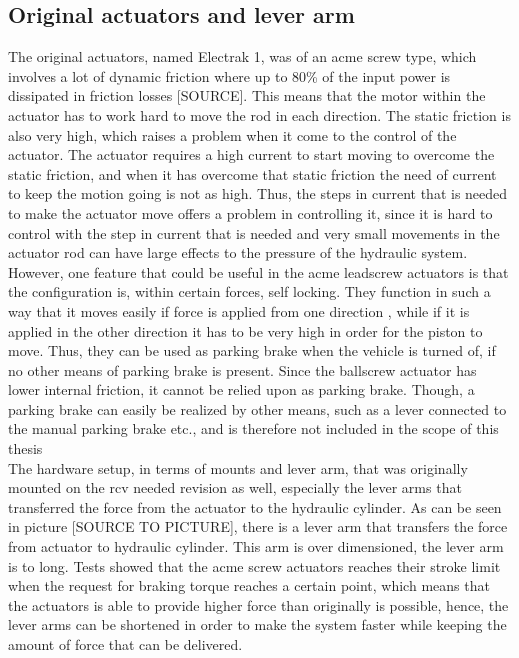 \documentclass[a4paper,11pt]{kth-mag}
\begin{document}
\subsection{Original actuators and lever arm}
The original actuators, named Electrak 1, was of an acme screw type, which involves a lot of dynamic friction where up to 80\% of the input power is dissipated in friction losses [SOURCE]. This means that the motor within the actuator has to work hard to move the rod in each direction. The static friction is also very high, which raises a problem when it come to the control of the actuator. The actuator requires a high current to start moving to overcome the static friction, and when it has overcome that static friction the need of current to keep the motion going is not as high. Thus, the steps in current that is needed to make the actuator move offers a problem in controlling it, since it is hard to control with the step in current that is needed and very small movements in the actuator rod can have large effects to the pressure of the hydraulic system. \\

However, one feature that could be useful in the acme leadscrew actuators is that the configuration is, within certain forces, self locking. They function in such a way that it moves easily if force is applied from one direction , while if it is applied in the other direction it has to be very high in order for the piston to move. Thus, they can be used as parking brake when the vehicle is turned of, if no other means of parking brake is present. Since the ballscrew actuator has lower internal friction, it cannot be relied upon as parking brake. Though, a parking brake can easily be realized by other means, such as a lever  connected to the manual parking brake etc., and is therefore not included in the scope of this thesis\\

The hardware setup, in terms of mounts and lever arm, that was originally mounted on the \gls{rcv} needed revision as well, especially the lever arms that transferred the force from the actuator to the hydraulic cylinder. As can be seen in picture [SOURCE TO PICTURE], there is a lever arm that transfers the force from actuator to hydraulic cylinder. This arm is over dimensioned, the lever arm is to long. Tests showed that the acme screw actuators reaches their stroke limit when the request for braking torque reaches a certain point, which means that the actuators is able to provide higher force than  originally is possible, hence, the lever arms can be shortened in order to make the system faster while keeping the amount of force that can be delivered. 
\end{document}
